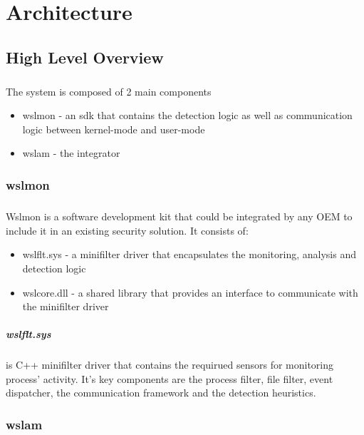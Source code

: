 \chapter{Architecture}
    \section{High Level Overview}
        \paragraph{}
        The system is composed of 2 main components
        \begin{itemize}
            \item wslmon - an sdk that contains the detection logic as well as communication logic between kernel-mode and user-mode
            \item wslam - the integrator
        \end{itemize}
    \subsection{wslmon}
        \paragraph{}
        Wslmon is a software development kit that could be integrated by any OEM to include it in an existing security solution. It consists of:
        \begin{itemize}
            \item wslflt.sys - a minifilter driver that encapsulates the monitoring, analysis and detection logic
            \item wslcore.dll - a shared library that provides an interface to communicate with the minifilter driver
        \end{itemize}
        \paragraph{wslflt.sys}
        is C++ minifilter driver that contains the requirued sensors for monitoring process' activity. It's key components are the
        process filter, file filter, event dispatcher, the communication framework and the detection heuristics.

    \subsection{wslam}
